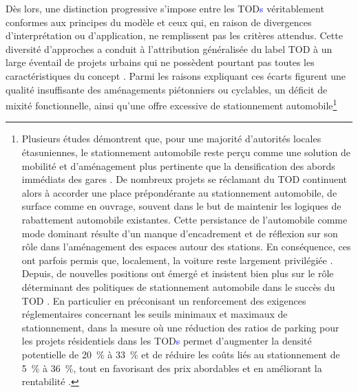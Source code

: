 \begin{refsegment}
Dès lors, une distinction progressive s’impose entre les \acrshort{TOD}\textcolor{blue}{s} véritablement conformes aux principes du modèle et ceux qui, en raison de divergences d’interprétation ou d’application, ne remplissent pas les critères attendus. Cette diversité d’approches a conduit à l’attribution généralisée du label \acrshort{TOD} à un large éventail de projets urbains qui ne possèdent pourtant pas toutes les caractéristiques du concept \textcolor{blue}{\autocite[4]{renne_transit-oriented_2013}}. Parmi les raisons expliquant ces écarts figurent une qualité insuffisante des aménagements piétonniers ou cyclables, un déficit de mixité fonctionnelle, ainsi qu’une offre excessive de stationnement automobile\footnote{
    Plusieurs études démontrent que, pour une majorité d'autorités locales étasuniennes, le stationnement automobile reste perçu comme une solution de mobilité et d'aménagement plus pertinente que la densification des abords immédiats des gares \textcolor{blue}{\autocite[106-107]{cervero_tcrp_2004}}. De nombreux projets se réclamant du \acrshort{TOD} continuent alors à accorder une place prépondérante au stationnement automobile, de surface comme en ouvrage, souvent dans le but de maintenir les logiques de \gls{rabattement} automobile existantes. Cette persistance de l’automobile comme mode dominant résulte d’un manque d’encadrement et de réflexion sur son rôle dans l’aménagement des espaces autour des stations. En conséquence, ces  ont parfois permis que, localement, la voiture reste largement privilégiée \textcolor{blue}{\autocite[39]{bentayou_transit-oriented_2015}}. Depuis, de nouvelles positions ont émergé et insistent bien plus sur le rôle déterminant des politiques de stationnement automobile dans le succès du \acrshort{TOD} \textcolor{blue}{\autocite[39]{bentayou_transit-oriented_2015}}. En particulier en préconisant un renforcement des exigences réglementaires concernant les seuils minimaux et maximaux de stationnement, dans la mesure où une réduction des ratios de parking pour les projets résidentiels dans les \acrshort{TOD}\textcolor{blue}{s} permet d'augmenter la densité potentielle de 20~\% à 33~\% et de réduire les coûts liés au stationnement de 5~\% à 36~\%, tout en favorisant des prix abordables et en améliorant la rentabilité \textcolor{blue}{\autocite[51-54]{arrington_effects_2008}}.
}
\end{refsegment}
